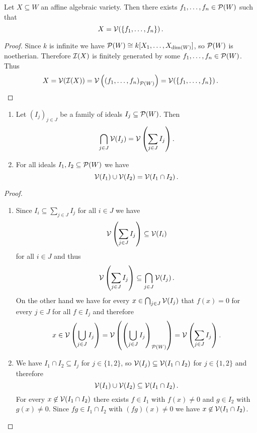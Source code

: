 \begin{corollary}
  Let $X \subseteq W$ an affine algebraic variety.
  Then there exists $f_1, \dotsc, f_n \in \mathcal{P}(W)$ such that
  \[
      X
    = \mathcal{V}( \{f_1, \dotsc, f_n\} ) \,.
  \]
\end{corollary}
\begin{proof}
  Since $k$ is infinite we have $\mathcal{P}(W) \cong k[X_1, \dotsc, X_{\dim(W)}]$, so $\mathcal{P}(W)$ is noetherian.
  Therefore $\mathcal{I}(X)$ is finitely generated by some $f_1, \dotsc, f_n \in \mathcal{P}(W)$.
  Thus
  \[
      X
    = \mathcal{V}( \mathcal{I}(X) )
    = \mathcal{V}\left( \left( f_1, \dotsc, f_n \right)_{\mathcal{P}(W)} \right)
    = \mathcal{V}( \{f_1, \dotsc, f_n\} ) \,.
    \qedhere
  \]
\end{proof}


\begin{proposition}
  \begin{enumerate}[label=\emph{\alph*)},leftmargin=*]
    \item
      Let $(I_j)_{j \in J}$ be a family of ideals $I_j \subseteq \mathcal{P}(W)$. Then
      \[
          \bigcap_{j \in J} \mathcal{V}(I_j)
        = \mathcal{V}\left( \sum_{j \in J} I_j \right).
      \]
    \item
      For all ideals $I_1, I_2 \subseteq \mathcal{P}(W)$ we have
      \[
          \mathcal{V}(I_1) \cup \mathcal{V}(I_2)
        = \mathcal{V}(I_1 \cap I_2) \,.
      \]
  \end{enumerate}
\end{proposition}
\begin{proof}
  \begin{enumerate}[label=\emph{\alph*)},leftmargin=*]
    \item
      Since $I_i \subseteq \sum_{j \in J} I_j$ for all $i \in J$ we have
      \[
                  \mathcal{V}\left( \sum_{j \in J} I_j \right)
        \subseteq \mathcal{V}(I_i)
      \]
      for all $i \in J$ and thus
      \[
                  \mathcal{V}\left( \sum_{j \in J} I_j \right)
        \subseteq \bigcap_{j \in J} \mathcal{V}(I_j) \,.
      \]
      On the other hand we have for every $x \in \bigcap_{j \in J} \mathcal{V}(I_j)$ that $f(x) = 0$ for every $j \in J$ for all $f \in I_j$ and therefore
      \[
            x
        \in \mathcal{V}\left( \bigcup_{j \in J} I_j \right)
        =   \mathcal{V}\left( \left( \bigcup_{j \in J} I_j \right)_{\mathcal{P}(W)} \right)
        =   \mathcal{V}\left( \sum_{j \in J} I_j \right).
      \]
    \item
      We have $I_1 \cap I_2 \subseteq I_j$ for $j \in \{1,2\}$, so $\mathcal{V}(I_j) \subseteq \mathcal{V}(I_1 \cap I_2)$ for $j \in \{1,2\}$ and therefore
      \[
                  \mathcal{V}(I_1) \cup \mathcal{V}(I_2)
        \subseteq \mathcal{V}(I_1 \cap I_2) \,.
      \]
      For every $x \not\in \mathcal{V}(I_1 \cap I_2)$ there exists $f \in I_1$ with $f(x) \neq 0$ and $g \in I_2$ with $g(x) \neq 0$.
      Since $fg \in I_1 \cap I_2$ with $(fg)(x) \neq 0$ we have $x \not\in \mathcal{V}(I_1 \cap I_2)$.
    \qedhere
  \end{enumerate}
\end{proof}


